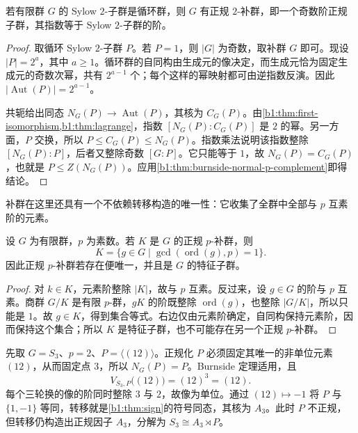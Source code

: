 \begin{corollary}\label{b1:cor:cyclic-sylow-two-complement}
	若有限群 \(G\) 的 Sylow \(2\)-子群是循环群，则 \(G\) 有正规 \(2\)-补群，即一个奇数阶正规子群，其指数等于 Sylow \(2\)-子群的阶。
\end{corollary}

\begin{proof}
	取循环 Sylow \(2\)-子群 \(P\)。若 \(P=1\)，则 \(|G|\) 为奇数，取补群 \(G\) 即可。现设 \(|P|=2^a\)，其中 \(a\geq1\)。循环群的自同构由生成元的像决定，而生成元恰为固定生成元的奇数次幂，共有 \(2^{a-1}\) 个；每个这样的幂映射都可由逆指数反演。因此 \(|\operatorname{Aut}(P)|=2^{a-1}\)。

	共轭给出同态 \(N_G(P)\rightarrow\operatorname{Aut}(P)\)，其核为 \(C_G(P)\)。由\cref{b1:thm:first-isomorphism,b1:thm:lagrange}，指数 \([N_G(P):C_G(P)]\) 是 \(2\) 的幂。另一方面，\(P\) 交换，所以 \(P\leq C_G(P)\leq N_G(P)\)。指数乘法说明该指数整除 \([N_G(P):P]\)，后者又整除奇数 \([G:P]\)。它只能等于 \(1\)，故 \(N_G(P)=C_G(P)\)，也就是 \(P\leq Z(N_G(P))\)。应用\cref{b1:thm:burnside-normal-p-complement}即得结论。
\end{proof}

补群在这里还具有一个不依赖转移构造的唯一性：它收集了全群中全部与 \(p\) 互素阶的元素。

\begin{proposition}\label{b1:prop:normal-p-complement-characteristic}
	设 \(G\) 为有限群，\(p\) 为素数。若 \(K\) 是 \(G\) 的正规 \(p\)-补群，则
	\[
		K=\{g\in G\mid \gcd(\operatorname{ord}(g),p)=1\}.
	\]
	因此正规 \(p\)-补群若存在便唯一，并且是 \(G\) 的特征子群。
\end{proposition}

\begin{proof}
	对 \(k\in K\)，元素阶整除 \(|K|\)，故与 \(p\) 互素。反过来，设 \(g\in G\) 的阶与 \(p\) 互素。商群 \(G/K\) 是有限 \(p\)-群，\(gK\) 的阶既整除 \(\operatorname{ord}(g)\)，也整除 \(|G/K|\)，所以只能是 \(1\)。故 \(g\in K\)，得到集合等式。右边仅由元素阶确定，自同构保持元素阶，因而保持这个集合；所以 \(K\) 是特征子群，也不可能存在另一个正规 \(p\)-补群。
\end{proof}

先取 \(G=S_3\)、\(p=2\)、\(P=\langle(12)\rangle\)。正规化 \(P\) 必须固定其唯一的非单位元素 \((12)\)，从而固定点 \(3\)，所以 \(N_G(P)=P\)。Burnside 定理适用，且
\[
	V_{S_3,P}\bigl((12)\bigr)=(12)^3=(12).
\]
每个三轮换的像的阶同时整除 \(3\) 与 \(2\)，故像为单位。通过 \((12)\mapsto-1\) 将 \(P\) 与 \(\{1,-1\}\) 等同，转移就是\cref{b1:thm:sign}的符号同态，其核为 \(A_3\)。此时 \(P\) 不正规，但转移仍构造出正规因子 \(A_3\)，分解为 \(S_3\cong A_3\rtimes P\)。

